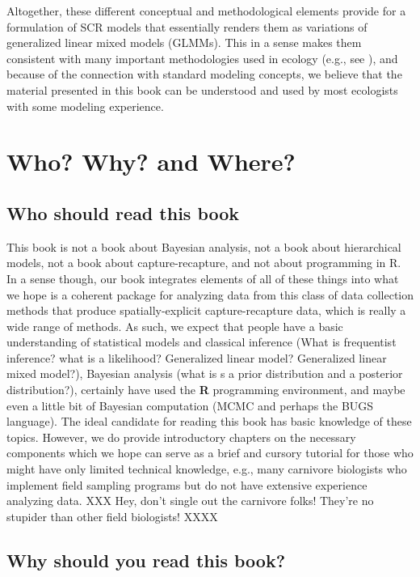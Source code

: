 


Altogether, these different conceptual and methodological elements
provide for a formulation of SCR models that essentially renders them
as variations of generalized linear mixed models (GLMMs). This in a
sense makes them consistent with many important methodologies used in
ecology (e.g., see \citet{zuur_etal:2009, kery_etal:2010}), and
because of the connection with standard modeling concepts, we believe
that the material presented in this book can be understood and used by
most ecologists with some modeling experience.


\section*{Who? Why? and Where?}

\subsection*{Who should read this book}

This book is not a book about Bayesian analysis, not a book about
hierarchical models, not a book about capture-recapture, and not about
programming in R. In a sense though, our book integrates elements of
all of these things into what we hope is a coherent package for
analyzing data from this class of data collection methods
that produce spatially-explicit capture-recapture data, which is really a wide range of methods.   As such, we
expect that people have a basic understanding of statistical models
and classical inference (What is frequentist inference? what is a
likelihood? Generalized linear model? Generalized linear mixed
model?), 
 Bayesian analysis (what is s a prior distribution and a
posterior distribution?),
certainly have used the {\bf R} programming environment,
and maybe even a little bit
of Bayesian
computation (MCMC and perhaps the BUGS language).
The ideal candidate for reading this book has basic knowledge of these
topics. However, we do provide introductory chapters on the necessary
components which we hope can serve as a brief and cursory tutorial for
those who might have only limited technical knowledge, e.g., many
carnivore biologists who implement field sampling programs but do not
have extensive experience analyzing data.
XXX Hey, don't single out the carnivore folks! They're no stupider than other field biologists! XXXX

\subsection*{Why should you read this book?}

